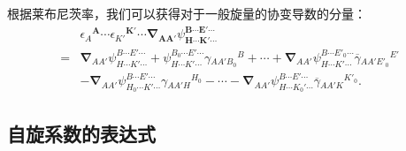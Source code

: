 根据莱布尼茨率，我们可以获得对于一般旋量的协变导数的分量：
\begin{equation*}
	\begin{aligned}
		& \epsilon {_{A}}^{\boldsymbol{A}} \cdots \epsilon {_{K'}}^{\boldsymbol{K} '} \cdots \boldsymbol{\nabla }_{\boldsymbol{AA} '} \psi _{\boldsymbol{H} \cdots \boldsymbol{K} '\cdots }^{\boldsymbol{B} \cdots \boldsymbol{E} '\cdots }\\
		= & \boldsymbol{\nabla }_{AA'} \psi _{H\cdots K'\cdots }^{B\cdots E'\cdots } +\psi _{H\cdots K'\cdots }^{B_{0} \cdots E'\cdots } \gamma {_{AA'B_{0}}}^{B} +\cdots +\boldsymbol{\nabla }_{AA'} \psi _{H\cdots K'\cdots }^{B\cdots E'_{0} \cdots }\overline{\gamma }{_{AA'E'_{0}}}^{E'}\\
		& -\boldsymbol{\nabla }_{AA'} \psi _{H_{0} \cdots K'\cdots }^{B\cdots E'\cdots } \gamma {_{AA'H}}^{H_{0}} -\cdots -\boldsymbol{\nabla }_{AA'} \psi _{H\cdots K_{0} '\cdots }^{B\cdots E'\cdots }\overline{\gamma }{_{AA'K}}^{K'_{0}} .
	\end{aligned}
\end{equation*}


\subsection{自旋系数的表达式}

